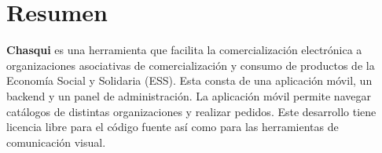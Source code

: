 \chapter*{Resumen}

\textbf{Chasqui} es una herramienta que facilita la comercialización electrónica a organizaciones asociativas de comercialización y consumo de productos de la Economía Social y Solidaria (ESS). Esta consta de una aplicación móvil, un backend y un panel de administración. La aplicación móvil permite navegar catálogos de distintas organizaciones y realizar pedidos. Este desarrollo tiene licencia libre para el código fuente así como para las herramientas de comunicación visual.
